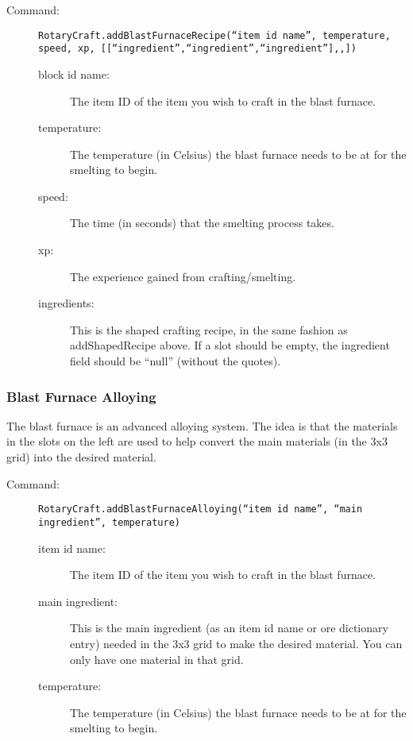 \documentclass[letterpaper,titlepage,12pt]{article}
\begin{document}
\begin{description}
\item[Command:] \texttt{RotaryCraft.addBlastFurnaceRecipe(``item id name'', temperature, speed, xp, [[``ingredient'',``ingredient'',``ingredient''],,])}
\begin{description}
\item [block id name:] The item ID of the item you wish to craft in the blast furnace.
\item [temperature:] The temperature (in Celsius) the blast furnace needs to be at for the smelting to begin.
\item [speed:] The time (in seconds) that the smelting process takes.
\item [xp:] The experience gained from crafting/smelting.
\item [ingredients:]  This is the shaped crafting recipe, in the same fashion as addShapedRecipe above.  If a slot should be empty, the ingredient field should be ``null'' (without the quotes).
\end{description}
\end{description}

\subsubsection{Blast Furnace Alloying}

The blast furnace is an advanced alloying system.  The idea is that the materials in the slots on the left are used to help convert the main materials (in the 3x3 grid) into the desired material.

\begin{description}
\item[Command:] \texttt{RotaryCraft.addBlastFurnaceAlloying(``item id name'', ``main ingredient'', temperature)}
\begin{description}
\item [item id name:] The item ID of the item you wish to craft in the blast furnace.
\item [main ingredient:]  This is the main ingredient (as an item id name or ore dictionary entry) needed in the 3x3 grid to make the desired material.  You can only have one material in that grid.
\item [temperature:] The temperature (in Celsius) the blast furnace needs to be at for the smelting to begin.
\end{description}
\end{description}
\end{document}

